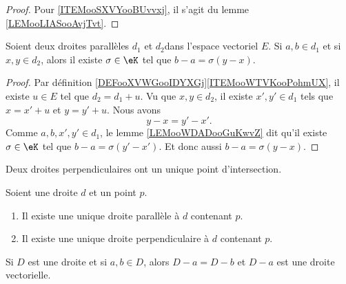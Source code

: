 \begin{proof}
	Pour \ref{ITEMooSXVYooBUvvxj}, il s'agit du lemme \ref{LEMooLIASooAvjTvt}.
\end{proof}

\begin{proposition}	\label{PROPooKWJLooIYVKhs}
	Soient deux droites parallèles \( d_1\) et \( d_2\)dans l'espace vectoriel \( E\). Si \( a,b\in d_1\) et si \( x,y\in d_2\), alors il existe \( \sigma\in \eK\) tel que \( b-a=\sigma(y-x)\).
\end{proposition}

\begin{proof}
	Par définition \ref{DEFooXVWGooIDYXGj}\ref{ITEMooWTVKooPohmUX}, il existe \( u\in E\) tel que \( d_2=d_1+u\). Vu que \( x,y\in d_2\), il existe \( x',y'\in d_1\) tels que \( x=x'+u\) et \( y=y'+u\). Nous avons
	\begin{equation}
		y-x=y'-x'.
	\end{equation}
	Comme \( a,b,x',y'\in d_1\), le lemme \ref{LEMooWDADooGuKwvZ} dit qu'il existe \( \sigma\in \eK\) tel que \( b-a=\sigma(y'-x')\). Et donc aussi \( b-a=\sigma(y-x)\).
\end{proof}

\begin{lemma}       \label{LEMooRLFQooJADark}
	Deux droites perpendiculaires ont un unique point d'intersection.
\end{lemma}

\begin{proposition}     \label{PROPooPWNWooYuyrOc}
	Soient une droite \( d\) et un point \( p\).
	\begin{enumerate}
		\item		\label{ITEMooFWIWooBBORjU}
		      Il existe une unique droite parallèle à \( d\) contenant \( p\).
		\item		\label{ITEMooWJDDooRiobAu}
		      Il existe une unique droite perpendiculaire à \( d\) contenant \( p\).
	\end{enumerate}
\end{proposition}

\begin{lemma}       \label{LEMooQQFFooEZYeck}
	Si \( D\) est une droite et si \( a,b\in D\), alors \( D-a=D-b\) et \( D-a\) est une droite vectorielle.
\end{lemma}

